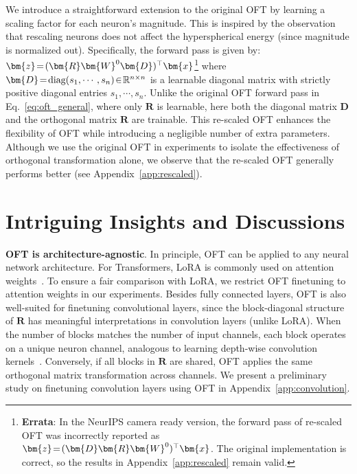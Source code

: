 We introduce a straightforward extension to the original OFT by learning a scaling factor for each neuron’s magnitude. This is inspired by the observation that rescaling neurons does not affect the hyperspherical energy (since magnitude is normalized out). Specifically, the forward pass is given by: $\thickmuskip=2mu \medmuskip=2mu\bm{z}=(\bm{R}\bm{W}^0\bm{D})^\top\bm{x}$\footnote{\textbf{Errata}: In the NeurIPS camera ready version, the forward pass of re-scaled OFT was incorrectly reported as $\thickmuskip=2mu \medmuskip=2mu\bm{z}=(\bm{D}\bm{R}\bm{W}^0)^\top\bm{x}$. The original implementation is correct, so the results in Appendix~\ref{app:rescaled} remain valid.} where $\thickmuskip=2mu \medmuskip=2mu \bm{D}=\text{diag}(s_1,\cdots,s_n)\in\mathbb{R}^{n\times n}$ is a learnable diagonal matrix with strictly positive diagonal entries $s_1,\cdots,s_n$. Unlike the original OFT forward pass in Eq.~\eqref{eq:oft_general}, where only $\bm{R}$ is learnable, here both the diagonal matrix $\bm{D}$ and the orthogonal matrix $\bm{R}$ are trainable. This re-scaled OFT enhances the flexibility of OFT while introducing a negligible number of extra parameters. Although we use the original OFT in experiments to isolate the effectiveness of orthogonal transformation alone, we observe that the re-scaled OFT generally performs better (see Appendix~\ref{app:rescaled}).

\section{Intriguing Insights and Discussions}

\textbf{OFT is architecture-agnostic}. In principle, OFT can be applied to any neural network architecture. For Transformers, LoRA is commonly used on attention weights~\cite{hulora2022}. To ensure a fair comparison with LoRA, we restrict OFT finetuning to attention weights in our experiments. Besides fully connected layers, OFT is also well-suited for finetuning convolutional layers, since the block-diagonal structure of $\bm{R}$ has meaningful interpretations in convolution layers (unlike LoRA). When the number of blocks matches the number of input channels, each block operates on a unique neuron channel, analogous to learning depth-wise convolution kernels~\cite{chollet2017xception}. Conversely, if all blocks in $\bm{R}$ are shared, OFT applies the same orthogonal matrix transformation across channels. We present a preliminary study on finetuning convolution layers using OFT in Appendix~\ref{app:convolution}.

